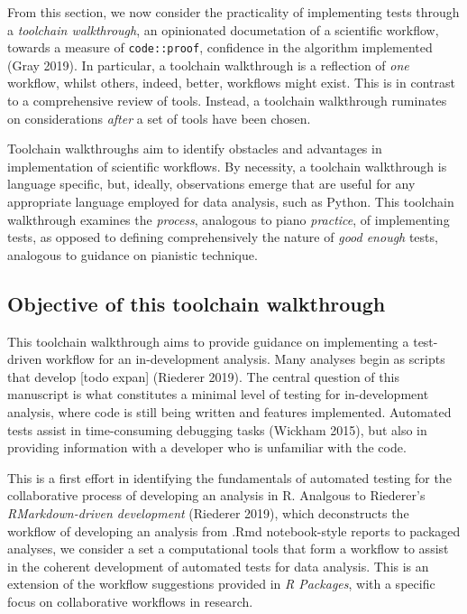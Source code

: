 \documentclass[
]{article}
\begin{document}
From this section, we now consider the practicality of implementing
tests through a \emph{toolchain walkthrough}, an opinionated
documetation of a scientific workflow, towards a measure of
\texttt{code::proof}, confidence in the algorithm implemented (Gray
2019). In particular, a toolchain walkthrough is a reflection of
\emph{one} workflow, whilst others, indeed, better, workflows might
exist. This is in contrast to a comprehensive review of tools. Instead,
a toolchain walkthrough ruminates on considerations \emph{after} a set
of tools have been chosen.

Toolchain walkthroughs aim to identify obstacles and advantages in
implementation of scientific workflows. By necessity, a toolchain
walkthrough is language specific, but, ideally, observations emerge that
are useful for any appropriate language employed for data analysis, such
as Python. This toolchain walkthrough examines the \emph{process},
analogous to piano \emph{practice}, of implementing tests, as opposed to
defining comprehensively the nature of \emph{good enough} tests,
analogous to guidance on pianistic technique.

\hypertarget{objective-of-this-toolchain-walkthrough}{%
\subsection{Objective of this toolchain
walkthrough}\label{objective-of-this-toolchain-walkthrough}}

This toolchain walkthrough aims to provide guidance on implementing a
test-driven workflow for an in-development analysis. Many analyses begin
as scripts that develop {[}todo expan{]} (Riederer 2019). The central
question of this manuscript is what constitutes a minimal level of
testing for in-development analysis, where code is still being written
and features implemented. Automated tests assist in time-consuming
debugging tasks (Wickham 2015), but also in providing information with a
developer who is unfamiliar with the code.

This is a first effort in identifying the fundamentals of automated
testing for the collaborative process of developing an analysis in R.
Analgous to Riederer's \emph{RMarkdown-driven development} (Riederer
2019), which deconstructs the workflow of developing an analysis from
.Rmd notebook-style reports to packaged analyses, we consider a set a
computational tools that form a workflow to assist in the coherent
development of automated tests for data analysis. This is an extension
of the workflow suggestions provided in \emph{R Packages}, with a
specific focus on collaborative workflows in research.
\end{document}
